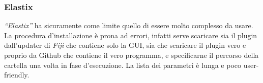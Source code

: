 \subsubsection{Elastix}
\noindent \textit{``Elastix''} ha sicuramente come limite quello di essere molto complesso da usare. La procedura d'installazione è prona ad errori, infatti serve scaricare sia il plugin dall'updater di \textit{Fiji} che contiene solo la GUI, sia che scaricare il plugin vero e proprio da Github che contiene il vero programma, e specificarne il percorso della cartella una volta in fase d'esecuzione. La lista dei parametri è lunga e poco user-friendly.